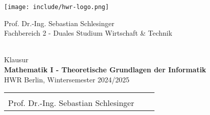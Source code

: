\thispagestyle{scrplain}
\vspace*{-3cm}
\begin{minipage}[t][1.1cm][c]{4.5cm}
  \texttt{[image: include/hwr-logo.png]}
\end{minipage}
\hfill
\begin{minipage}[t][1.5cm][c]{8cm}
  \begin{center}
  \begin{footnotesize}
    \textsf{Prof. Dr.-Ing. Sebastian Schlesinger} \\[-0.1cm]
    \textsf{Fachbereich 2 - Duales Studium Wirtschaft \& Technik}
  \end{footnotesize}
  \end{center}
\end{minipage}
\hfill

\vspace*{-0.3cm}
\begin{center} 
  \hrulefill \\[0.1cm]
  {\large Klausur} \\[0.15cm]
  {\huge \bfseries Mathematik I - Theoretische Grundlagen der Informatik} \\[0.10cm]
  {HWR Berlin, Wintersemester 2024/2025} \\[-0.4cm]
  \begin{tabular}{lcr}
    \hspace{0.3\textwidth}   & \hspace{0.3\textwidth} & \hspace{0.3\textwidth} \\
    Prof. Dr.-Ing. Sebastian Schlesinger   %
  \end{tabular} \\[0.1cm]
  \hrulefill
\end{center}